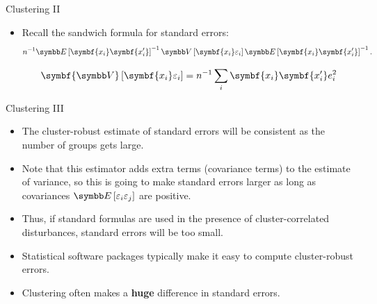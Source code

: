 \documentclass[aspectratio=169,11pt]{beamer}
\begin{document}
\begin{frame}{Clustering II}
\begin{itemize}
	\item Recall the sandwich formula for standard errors:
	\begin{align*}
		n^{-1} \E\left[\symbf {x_i} \symbf {x_i'} \right]^{-1} \Var \left[\symbf {x_i} \varepsilon_i \right] \E\left[\symbf {x_i} \symbf {x_i'} \right]^{-1}.
	\end{align*}

	\begin{align*}
	\symbf{\Var}\left[\symbf {x_i} \varepsilon_i \right] = n^{-1} \sum_{i} \symbf{x_i} \symbf{x_i'}  e_i^2
	\end{align*}


\end{itemize}
\end{frame}



\begin{frame}{Clustering III}
\begin{itemize}
	\item The cluster-robust estimate of standard errors will be consistent as the number of groups 
	gets large.

	\item Note that this estimator adds extra terms (covariance terms) to the estimate of variance,
	so this is going to make standard errors larger as long as covariances $\E\left[\varepsilon_i \varepsilon_j\right]$ are positive. 

	\item Thus, if standard formulas are used in the presence of cluster-correlated disturbances, 
	standard errors will be too small.

	\item Statistical software packages typically make it easy to compute cluster-robust errors.
	
	\item Clustering often makes a {\bf huge} difference in standard errors.

\end{itemize}
\end{frame}
\end{document}
